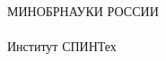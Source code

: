 \thispagestyle{empty}


\begin{center}
МИНОБРНАУКИ РОССИИ\\
\thesisOrganization
\\
Институт СПИНТех
\end{center}
%
\vspace{0pt plus4fill} %
%
%
\vspace{0pt plus6fill} %
\begin{center}
{\large \thesisAuthor}
\end{center}
%
\vspace{0pt plus1fill} %
